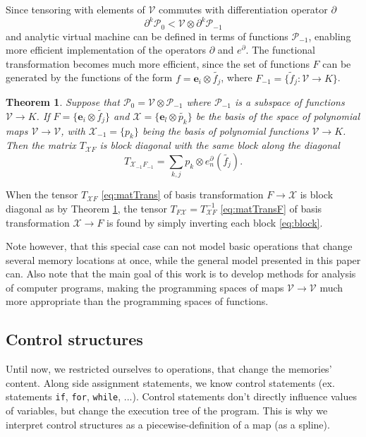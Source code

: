 \documentclass[smallcondensed]{svjour3}
\newcommand{\VV}{\mathcal{V}}
\newcommand{\e}{\mathbf{e}}
\newcommand{\X}{\mathcal{X}}
\newcommand{\dP}{\mathcal{P}}
\newcommand{\D}{\partial}
\newtheorem{izrek}{Theorem}[section]
\begin{document}
Since tensoring with elements of $\VV$ commutes with differentiation operator $\D$
\begin{equation}
  \label{eq:dP0_dP-1}
  \D^k\dP_0 < \VV\otimes \D^k\dP_{-1}
\end{equation}
and analytic virtual machine can be defined in terms of functions $\dP_{-1}$,
enabling more efficient implementation of the operators $\D$ and $e^\D$. The
functional transformation becomes much more efficient, since the set of
functions $F$ can be generated by the functions of the form  $f=\e_i\otimes
\tilde{f_j}$, where $F_{-1}=\{\tilde{f}_j:\VV\to K \}$.
\begin{izrek}\label{izr:blockDiagonal}
Suppose that $\dP_0=\VV\otimes \dP_{-1}$ where $\dP_{-1}$ is a subspace of functions $\VV\to K$. If $F=\{\e_i\otimes \tilde{f_j}\}$ and $\X=\{\e_l\otimes \tilde{p_k}\}$ be the basis of the space of polynomial maps $\VV\to\VV$, with $\X_{-1}=\{p_k\}$ being the basis
of polynomial functions $\VV\to K$. Then the matrix $T_{\X F}$ is block diagonal with the same block along the diagonal
\begin{equation}
  \label{eq:block}
  T_{\X_{-1}F_{-1}} = \sum\limits_{k,j} p_k\otimes e^{\D}_n(\tilde{f_j}).
\end{equation}
\end{izrek}
\begin{corollary}
When the tensor $T_{\X F}$ \eqref{eq:matTrans} of basis transformation $F\to\X$ is block diagonal as by Theorem \ref{izr:blockDiagonal}, the tensor $T_{F\X}=T_{\X F}^{-1}$ \eqref{eq:matTransF} of basis transformation $\X\to F$ is found by simply inverting each block \eqref{eq:block}.
\end{corollary}
Note however, that this special case can not model basic operations that
change several memory locations at once, while the general model presented in this paper can. Also note that the main goal of this
work is to develop methods for analysis of computer programs, making the programming
spaces of maps $\VV\to \VV$ much more appropriate than the programming spaces of
functions.
 \subsection{Control structures}\label{sec:control}
 
 Until now, we restricted ourselves to operations, that change the memories' content. Along side assignment statements, we know control statements (ex. statements \texttt{if},
  \texttt{for}, \texttt{while}, ...). Control statements don't directly
  influence values of variables, but change the execution tree of the program. This is why
  we interpret control structures as a piecewise-definition of a map (as a spline).
  
\end{document}
